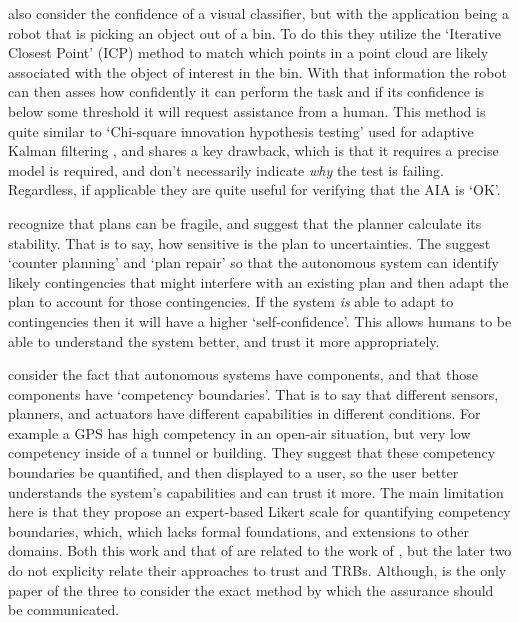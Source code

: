     \citet{Kaipa2015-hy} also consider the confidence of a visual classifier, but with the application being a robot that is picking an object out of a bin. To do this they utilize the `Iterative Closest Point' (ICP) method to match which points in a point cloud are likely associated with the object of interest in the bin. With that information the robot can then asses how confidently it can perform the task and if its confidence is below some threshold it will request assistance from a human. This method is quite similar to `Chi-square innovation hypothesis testing' used for adaptive Kalman filtering \cite{Bar-Shalom2001-tg}, and shares a key drawback, which is that it requires a precise model is required, and don't necessarily indicate \emph{why} the test is failing. Regardless, if applicable they are quite useful for verifying that the AIA is `OK'.

    \citet{Kuter2015-qh} recognize that plans can be fragile, and suggest that the planner calculate its stability. That is to say, how sensitive is the plan to uncertainties. The suggest `counter planning' and `plan repair' so that the autonomous system can identify likely contingencies that might interfere with an existing plan and then adapt the plan to account for those contingencies. If the system \emph{is} able to adapt to contingencies then it will have a higher `self-confidence'. This allows humans to be able to understand the system better, and trust it more appropriately.

    \citet{Hutchins2015-if} consider the fact that autonomous systems have components, and that those components have `competency boundaries'. That is to say that different sensors, planners, and actuators have different capabilities in different conditions. For example a GPS has high competency in an open-air situation, but very low competency inside of a tunnel or building. They suggest that these competency boundaries be quantified, and then displayed to a user, so the user better understands the system's capabilities and can trust it more. The main limitation here is that they propose an expert-based Likert scale for quantifying competency boundaries, which, which  lacks formal foundations, and extensions to other domains. Both this work and that of  are related to the work of \citeauthor{Aitken2016-fb}, but the later two do not explicity relate their approaches to trust and TRBs. Although, \citeauthor{Hutchins2015-if} is the only paper of the three to consider the exact method by which the assurance should be communicated.

